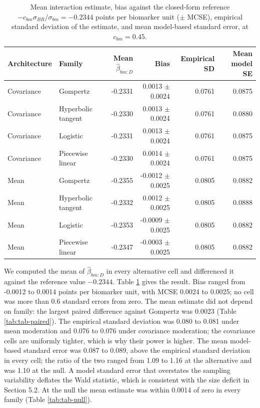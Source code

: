 \documentclass[
  11pt,
]{article}
\begin{document}
\begin{table}

\caption{\label{tab:tab-bias}Mean interaction estimate, bias against the closed-form reference $-c_{bm}\sigma_{BR}/\sigma_{bm} = -0.2344$ points per biomarker unit ($\pm$ MCSE), empirical standard deviation of the estimate, and mean model-based standard error, at $c_{bm} = 0.45$.}
\centering
\begin{tabular}[t]{llrrrr}
\toprule
Architecture & Family & Mean $\hat\beta_{bm:D}$ & Bias & Empirical SD & Mean model SE\\
\midrule
Covariance & Gompertz & -0.2331 & 0.0013 $\pm$ 0.0024 & 0.0761 & 0.0875\\
Covariance & Hyperbolic tangent & -0.2330 & 0.0013 $\pm$ 0.0024 & 0.0761 & 0.0880\\
Covariance & Logistic & -0.2331 & 0.0013 $\pm$ 0.0024 & 0.0761 & 0.0875\\
Covariance & Piecewise linear & -0.2330 & 0.0014 $\pm$ 0.0024 & 0.0761 & 0.0875\\
Mean & Gompertz & -0.2355 & -0.0012 $\pm$ 0.0025 & 0.0805 & 0.0882\\
\addlinespace
Mean & Hyperbolic tangent & -0.2332 & 0.0012 $\pm$ 0.0025 & 0.0805 & 0.0888\\
Mean & Logistic & -0.2353 & -0.0009 $\pm$ 0.0025 & 0.0805 & 0.0882\\
Mean & Piecewise linear & -0.2347 & -0.0003 $\pm$ 0.0025 & 0.0805 & 0.0882\\
\bottomrule
\end{tabular}
\end{table}

We computed the mean of \(\hat\beta_{bm:D}\) in every alternative cell
and differenced it against the reference value
\(-0.2344\). Table \ref{tab:tab-bias} gives the result.
Bias ranged from -0.0012 to 0.0014 points per biomarker unit, with MCSE 0.0024 to 0.0025; no cell was more than 0.6 standard errors from zero. The mean estimate did not depend on family: the largest paired difference against Gompertz was 0.0023 (Table \ref{tab:tab-paired}). The empirical standard deviation was 0.080 to 0.081 under mean moderation and 0.076 to 0.076 under covariance moderation; the covariance cells are uniformly tighter, which is why their power is higher. The mean model-based standard error was 0.087 to 0.089, above the empirical standard deviation in every cell; the ratio of the two ranged from 1.09 to 1.16 at the alternative and was 1.10 at the null. A model standard error that overstates the sampling variability deflates the Wald statistic, which is consistent with the size deficit in Section 5.2. At the null the mean estimate was within 0.0014 of zero in every family (Table \ref{tab:tab-null}).
\end{document}
